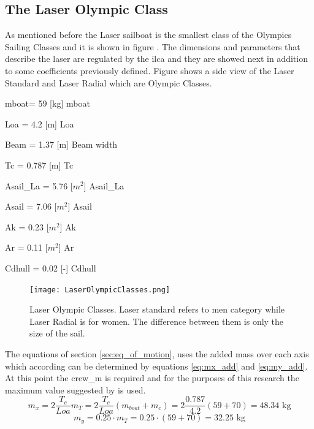 \subsection{The Laser Olympic Class}
As mentioned before the Laser sailboat is the smallest class of the Olympics Sailing Classes and it is shown in figure . The dimensions and parameters that describe the laser are regulated by the \acrfull{ilca} and they are showed next in addition to some coefficients previously defined. Figure shows a side view of the Laser Standard and Laser Radial which are Olympic Classes. %
\begin{description}
        \item \acrshort{mboat}= 59 [kg] \acrlong{mboat}
        \item \acrshort{Loa} = 4.2 [m] \acrlong{Loa}
        \item Beam = 1.37 [m] Beam width
        \item \acrshort{Tc} = 0.787 [m] \acrlong{Tc}
        \item \acrshort{Asail_La} = 5.76 [$m^2$] \acrlong{Asail_La}
        \item \acrshort{Asail} =  7.06 [$m^2$] \acrlong{Asail}
        \item \acrshort{Ak} = 0.23 [$m^2$] \acrlong{Ak}
        \item \acrshort{Ar} = 0.11 [$m^2$] \acrlong{Ar}
        \item \acrshort{Cdhull} = 0.02 [-] \acrlong{Cdhull}
    \end{description}
\begin{figure} [hbt!]
    \centering
    \texttt{[image: LaserOlympicClasses.png]}
    \caption{Laser Olympic Classes. Laser standard refers to men category while Laser Radial is for women. The difference between them is only the size of the sail. \cite{2015LaserAssociation}}
    \label{fig:LaserSideView}
\end{figure}
The equations of section \ref{sec:eq_of_motion}, uses the added mass over each axis which according \cite{keuning2004mathematical} can be determined by equations \ref{eq:mx_add} and \ref{eq:my_add}. At this point the \acrshort{crew_m} is required and for the purposes of this research the maximum value suggested by \cite{laser_opt} is used. 
\begin{equation}\label{eq:mx_add}
    m_{x}=2\frac{T_{c}} {Loa} m_{T}=2\frac{T_{c}} {Loa} (m_{boat} + m_{c})=2\frac{0.787}{4.2}(59+70)=48.34 \text{ kg}
\end{equation}
\begin{equation} \label{eq:my_add}
    m_{y}=0.25 \cdot m_{T}=0.25 \cdot (59+70) = 32.25 \text{ kg}
\end{equation}

